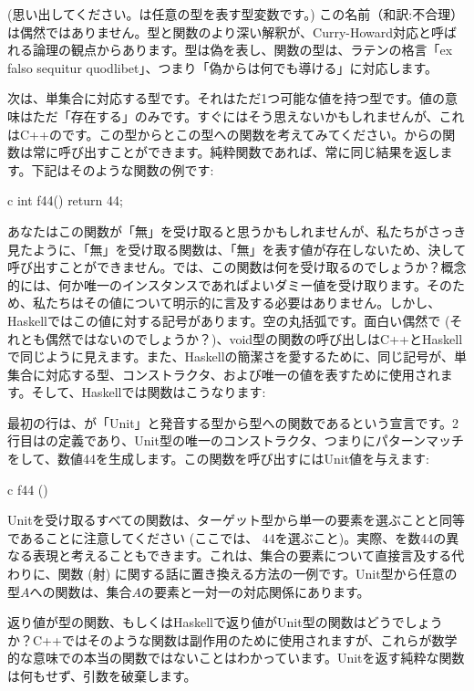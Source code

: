  (思い出してください。は任意の型を表す型変数です。) この名前（和訳:不合理）は偶然ではありません。型と関数のより深い解釈が、Curry-Howard対応と呼ばれる論理の観点からあります。型は偽を表し、関数の型は、ラテンの格言「ex falso sequitur quodlibet」、つまり「偽からは何でも導ける」に対応します。

次は、単集合に対応する型です。それはただ1つ可能な値を持つ型です。値の意味はただ「存在する」のみです。すぐにはそう思えないかもしれませんが、これはC++のです。この型からとこの型への関数を考えてみてください。からの関数は常に呼び出すことができます。純粋関数であれば、常に同じ結果を返します。下記はそのような関数の例です: 

\begin{snip}{c}
int f44() { return 44; }
\end{snip}
あなたはこの関数が「無」を受け取ると思うかもしれませんが、私たちがさっき見たように、「無」を受け取る関数は、「無」を表す値が存在しないため、決して呼び出すことができません。では、この関数は何を受け取るのでしょうか？概念的には、何か唯一のインスタンスであればよいダミー値を受け取ります。そのため、私たちはその値について明示的に言及する必要はありません。しかし、Haskellではこの値に対する記号があります。空の丸括弧\code{()}です。面白い偶然で (それとも偶然ではないのでしょうか？)、void型の関数の呼び出しはC++とHaskellで同じように見えます。また、Haskellの簡潔さを愛するために、同じ記号\code{()}が、単集合に対応する型、コンストラクタ、および唯一の値を表すために使用されます。そして、Haskellでは関数はこうなります: 

最初の行は、が「Unit」と発音する型\code{()}から型への関数であるという宣言です。2行目はの定義であり、Unit型の唯一のコンストラクタ、つまり\code{()}にパターンマッチをして、数値44を生成します。この関数を呼び出すにはUnit値\code{()}を与えます: 

\begin{snip}{c}
f44 ()
\end{snip}
Unitを受け取るすべての関数は、ターゲット型から単一の要素を選ぶことと同等であることに注意してください (ここでは、 44を選ぶこと)。実際、を数44の異なる表現と考えることもできます。これは、集合の要素について直接言及する代わりに、関数 (射) に関する話に置き換える方法の一例です。Unit型から任意の型$A$への関数は、集合$A$の要素と一対一の対応関係にあります。

返り値が型の関数、もしくはHaskellで返り値がUnit型の関数はどうでしょうか？C++ではそのような関数は副作用のために使用されますが、これらが数学的な意味での本当の関数ではないことはわかっています。Unitを返す純粋な関数は何もせず、引数を破棄します。

